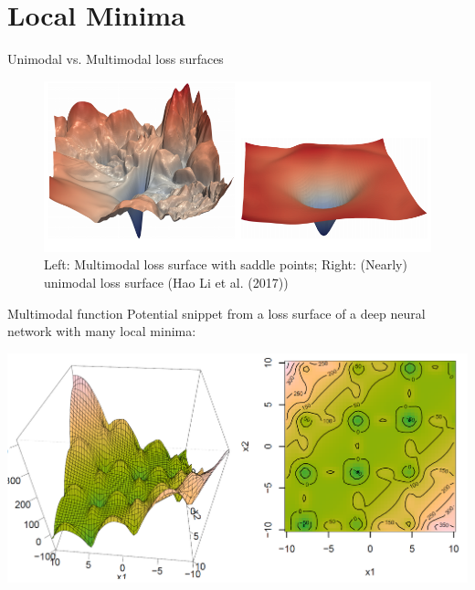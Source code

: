 \section{Local Minima}

\begin{vbframe}{Unimodal vs. Multimodal loss surfaces}
  \begin{figure}
  \centering
    \includegraphics[width=12cm]{figure/difficult_vs_easy.png}
    \caption{Left: Multimodal loss surface with saddle points; Right: (Nearly) unimodal loss surface (Hao Li et al. (2017))}
  \end{figure}
\end{vbframe}


\begin{vbframe}{Multimodal function}
Potential snippet from a loss surface of a deep neural network with many local minima:

\begin{center}
  \includegraphics[width=.9\textwidth]{figure/multimodal.png}
\end{center}

\end{vbframe}

